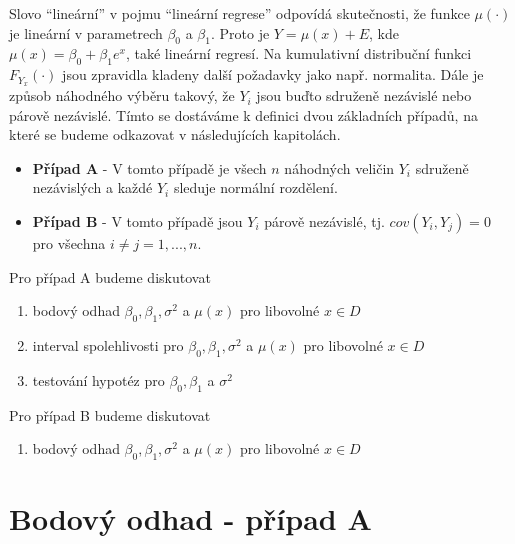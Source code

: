 Slovo ``lineární'' v pojmu ``lineární regrese'' odpovídá skutečnosti, že funkce $\mu(\cdot)$ je lineární v parametrech $\beta_0$ a $\beta_1$. Proto je $Y = \mu(x) + E$, kde $\mu(x) = \beta_0 + \beta_1 e^x$, také lineární regresí. Na kumulativní distribuční funkci $F_{Y_x}(\cdot)$ jsou zpravidla kladeny další požadavky jako např. normalita. Dále je způsob náhodného výběru takový, že $Y_i$ jsou buďto sdruženě nezávislé nebo párově nezávislé. Tímto se dostáváme k definici dvou základních případů, na které se budeme odkazovat v následujících kapitolách.

\begin{itemize}
\item \textbf{Případ A} - V tomto případě je všech $n$ náhodných veličin $Y_i$ sdruženě nezávislých a každé $Y_i$ sleduje normální rozdělení.
\item \textbf{Případ B} - V tomto případě jsou $Y_i$ párově nezávislé, tj. $cov(Y_i, Y_j) = 0$ pro všechna $i \neq j = 1, ..., n$.
\end{itemize}

Pro případ A budeme diskutovat
\begin{enumerate}
\item bodový odhad $\beta_0, \beta_1, \sigma^2$ a $\mu(x)$ pro libovolné $x \in D$
\item interval spolehlivosti pro $\beta_0, \beta_1, \sigma^2$ a $\mu(x)$ pro libovolné $x \in D$
\item testování hypotéz pro $\beta_0, \beta_1$ a $\sigma^2$
\end{enumerate}

Pro případ B budeme diskutovat
\begin{enumerate}
\item bodový odhad $\beta_0, \beta_1, \sigma^2$ a $\mu(x)$ pro libovolné $x \in D$
\end{enumerate}

\section{Bodový odhad - případ A}

